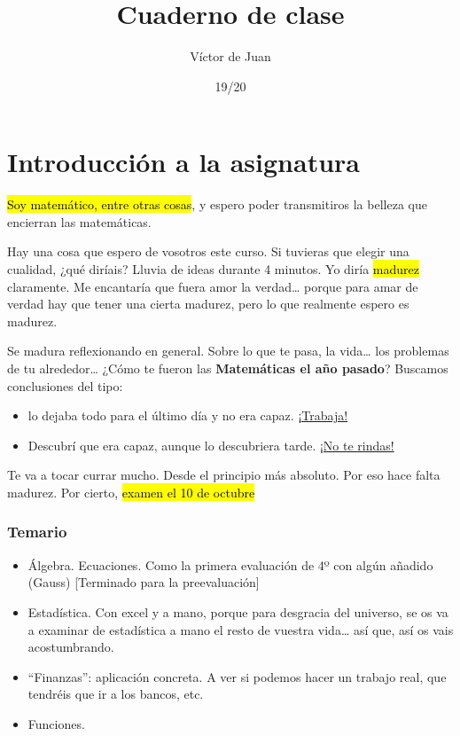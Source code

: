 \documentclass[palatino,nosec]{Docencia}
\title{Cuaderno de clase}
\author{Víctor de Juan}
\date{19/20}
\begin{document}
\pagestyle{plain}
\maketitle
\tableofcontents



\chapter{Introducción a la asignatura}


\hl{Soy matemático, entre otras cosas}, y espero poder transmitiros la belleza que encierran las matemáticas.

Hay una cosa que espero de vosotros este curso.
%
Si tuvieras que elegir una cualidad, ¿qué diríais? Lluvia de ideas durante 4 minutos. Yo diría \hl{madurez} claramente. Me encantaría que fuera amor la verdad… porque para amar de verdad hay que tener una cierta madurez, pero lo que realmente espero es madurez.

Se madura reflexionando en general. Sobre lo que te pasa, la vida… los problemas de tu alrededor…  ¿Cómo te fueron las \textbf{Matemáticas el año pasado}? Buscamos conclusiones del tipo: 
\begin{itemize}
	\item lo dejaba todo para el último día y no era capaz. \ul{¡Trabaja!}
	\item Descubrí que era capaz, aunque lo descubriera tarde. \ul{¡No te rindas!}
\end{itemize}

Te va a tocar currar mucho. Desde el principio más absoluto. Por eso hace falta madurez. Por cierto, \hl{examen el 10 de octubre}

\subsection{Temario}

\begin{itemize}
	\item Álgebra. Ecuaciones. Como la primera evaluación de 4º con algún añadido (Gauss) [Terminado para la preevaluación]
	\item Estadística. Con excel y a mano, porque para desgracia del universo, se os va a examinar de estadística a mano el resto de vuestra vida… así que, así os vais acostumbrando.
	\item “Finanzas”: aplicación concreta. A ver si podemos hacer un trabajo real, que tendréis que ir a los bancos, etc. 
	\item Funciones.
\end{itemize}
\end{document}
